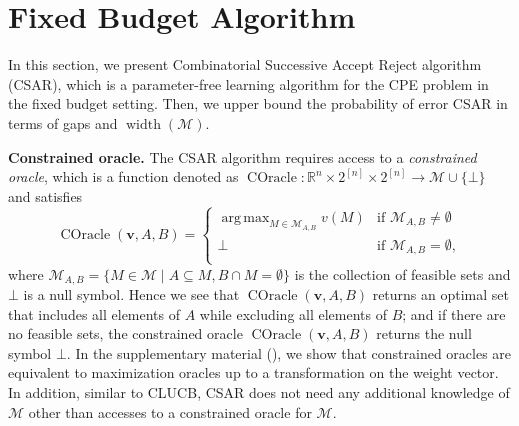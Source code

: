 \documentclass{article}
\newcommand{\Algorithm}{{\small \textsf{CLUCB}}\xspace}
\newcommand{\AlgorithmBud}{{\small \textsf{CSAR}}\xspace}
\newcommand{\Problem}{{CPE}\xspace}
\newcommand{\M}{\mathcal M}
\newcommand{\RR}{\mathbb R}
\DeclareMathOperator{\rank}{width}
\DeclareMathOperator*{\argmax}{arg\,max}
\DeclareMathOperator{\COracle}{COracle}
\renewcommand{\vec}[1]{\boldsymbol{#1}}
\begin{document}
\vspace{-0.5em}
\section{Fixed Budget Algorithm}
\vspace{-0.5em}
In this section, we present Combinatorial Successive Accept Reject algorithm (\AlgorithmBud), which is a parameter-free learning algorithm for the \Problem problem in the fixed budget setting.
Then, we upper bound the probability of error \AlgorithmBud in terms of gaps and $\rank(\M)$.

\textbf{Constrained oracle.} 
The \AlgorithmBud algorithm requires access to a \emph{constrained oracle}, which is a function denoted as $\COracle: \RR^{n}\times 2^{[n]} \times 2^{[n]} \rightarrow \M \cup \{\bot\}$ and satisfies
\begin{equation}
\label{eq:coracle-def}
\COracle(\vec v, A, B)=
\begin{cases} 
	\argmax_{M\in \M_{A,B}} v(M) & \text{if } \M_{A,B} \not= \emptyset\\
	\bot & \text{if }\M_{A,B} = \emptyset,\\
\end{cases}
\end{equation}
where $\M_{A,B}=\{M\in \M \mid A\subseteq M, B\cap M = \emptyset\}$ is the collection of feasible sets and $\bot$ is a null symbol.
Hence we see that $\COracle(\vec v, A, B)$ returns an optimal set that includes all elements of $A$ while excluding all elements of $B$; and if there are no feasible sets, the constrained oracle $\COracle(\vec v, A, B)$ returns the null symbol $\bot$.
In the supplementary material (), we show that constrained oracles are equivalent to maximization oracles up to a transformation on the weight vector.
In addition, similar to \Algorithm, \AlgorithmBud does not need any additional knowledge of $\M$ other than accesses to a constrained oracle for $\M$.
\end{document}
